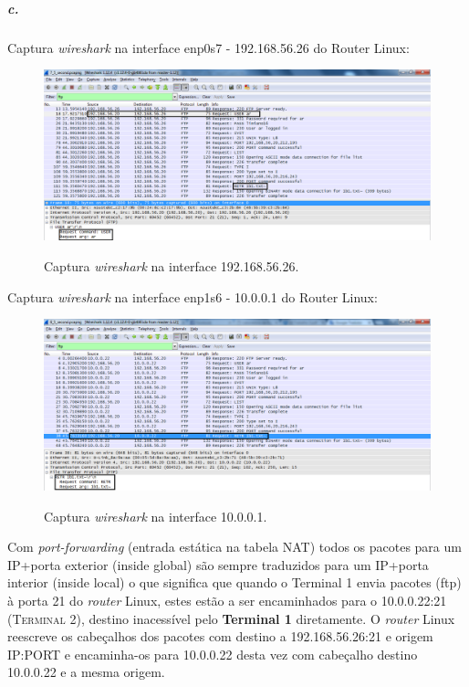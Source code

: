 \subparagraph{c.}
Captura \emph{wireshark} na interface \textsf{enp0s7 - 192.168.56.26} do \textsf{Router Linux}:

\begin{figure}[h]
\centering
\includegraphics[width=1\textwidth, height=0.3\textheight]{5_b-enp0s7.png}
\label{fig:enp0s7}
\caption{Captura \emph{wireshark} na interface \textsf{192.168.56.26}.}
\end{figure}

Captura \emph{wireshark} na interface \textsf{enp1s6 - 10.0.0.1} do \textsf{Router Linux}:

\begin{figure}[h]
\centering
\includegraphics[width=1\textwidth, height=0.3\textheight]{5_b-enp1s6.png}
\label{fig:enp1s6}
\caption{Captura \emph{wireshark} na interface \textsf{10.0.0.1}.}
\end{figure}

Com \emph{port-forwarding} (entrada estática na tabela NAT) todos os
pacotes para um IP+porta exterior (inside global) são sempre
traduzidos para um IP+porta interior (inside local) o que significa
que quando o \textsf{Terminal 1} envia pacotes (ftp) à porta 21 do 
\textsf{\emph{router} Linux}, estes estão a ser encaminhados para o \textsf{10.0.0.22:21} (\textsc{Terminal 2}), destino inacessível pelo 
\textbf{Terminal 1} diretamente. O \textsf{\emph{router} Linux} 
reescreve os cabeçalhos dos pacotes com destino a \textsf{192.168.56.26:21} 
e origem \textsf{IP:PORT} e encaminha-os para \textsf{10.0.0.22} 
desta vez com cabeçalho destino \textsf{10.0.0.22} e a mesma origem.


